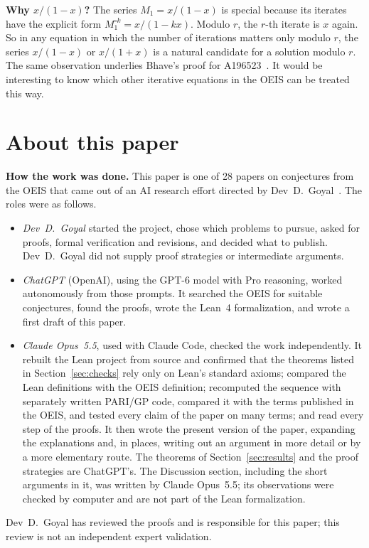 \documentclass[11pt,a4paper]{article}
\theoremstyle{definition}
\theoremstyle{remark}
\newcommand{\para}[1]{\par\medskip\noindent\textbf{#1}\enspace}
\begin{document}
\para{Why $x/(1-x)$?} The series $M_1=x/(1-x)$ is special because its iterates have the explicit form $M_1^{\circ k}=x/(1-kx)$.
Modulo $r$, the $r$-th iterate is $x$ again. So in any equation in which the number of iterations matters only modulo
$r$, the series $x/(1-x)$ or $x/(1+x)$ is a natural candidate for a solution modulo $r$. The same observation underlies Bhave's proof
for A196523~\cite{oeisB}. It would be interesting to know which other iterative equations in the OEIS can be treated
this way.

\section*{About this paper}\label{sec:about}
\para{How the work was done.}
This paper is one of 28 papers on conjectures from the OEIS that came out of an AI research effort directed by
Dev~D.~Goyal~\cite{repo}. The roles were as follows.
\begin{itemize}
\item \emph{Dev~D.~Goyal} started the project, chose which problems to pursue, asked for proofs, formal verification and
revisions, and decided what to publish. Dev~D.~Goyal did not supply proof strategies or intermediate arguments.
\item \emph{ChatGPT} (OpenAI), using the GPT-6 model with Pro reasoning, worked autonomously from those prompts. It
searched the OEIS for suitable conjectures, found the proofs, wrote the Lean~4 formalization, and wrote a first draft
of this paper.
\item \emph{Claude Opus~5.5}, used with Claude Code, checked the work independently. It rebuilt the Lean project from source and confirmed that the theorems listed in Section~\ref{sec:checks} rely only on
Lean's standard axioms; compared the Lean definitions with the OEIS definition; recomputed the sequence with separately
written PARI/GP code, compared it with the terms published in the OEIS, and tested every claim of the paper on many
terms; and read every step of the proofs. It then wrote the present version of the paper, expanding the
explanations and, in places, writing out an argument in more detail or by a more elementary route. The theorems of
Section~\ref{sec:results} and the proof strategies are ChatGPT's. The Discussion section, including the short arguments
in it, was written by Claude Opus~5.5; its observations were checked by computer and are not part of the Lean
formalization.
\end{itemize}
Dev~D.~Goyal has reviewed the proofs and is responsible for this paper; this review is not an independent expert
validation.
\end{document}
